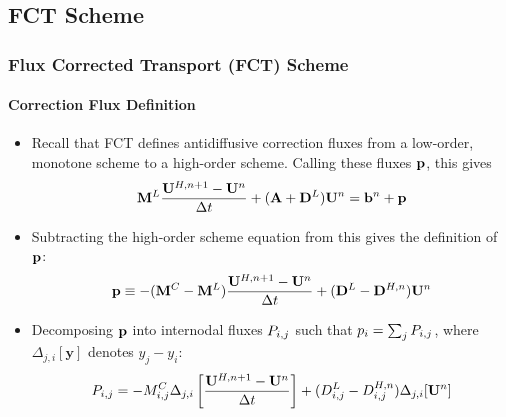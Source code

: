 \documentclass{beamer}
\begin{document}
\subsection{FCT Scheme}
\begin{frame}
\frametitle{Flux Corrected Transport (FCT) Scheme}
\framesubtitle{Correction Flux Definition}

\begin{itemize}
   \item Recall that FCT defines antidiffusive correction fluxes
      from a low-order, monotone scheme to a high-order scheme. Calling
      these fluxes $\mathbf{p}$, this gives
      \begin{equation}
        \lumpedmassmatrix\frac{\solutionvector^{H,n+1}-\solutionvector^n}{\dt}
          + (\ssmatrix+\diffusionmatrix^L)\solutionvector^n = \ssrhs^n
          + \correctionfluxvector
      \end{equation}
   \item Subtracting the high-order scheme equation from this gives the
      definition of $\mathbf{p}$:
      \begin{equation}
        \correctionfluxvector \equiv
          -(\consistentmassmatrix-\lumpedmassmatrix)
          \frac{\solutionvector^{H,n+1}-\solutionvector^n}{\dt}
          + (\diffusionmatrix^L-\diffusionmatrix^{H,n})\solutionvector^n
      \end{equation}
   \item Decomposing $\mathbf{p}$ into internodal fluxes
      $\correctionfluxij$ such that $\correctionfluxletter_i = \sum_j \correctionfluxij$, where $\Delta_{j,i}[\mathbf{y}]$
      denotes $y_j - y_i$:
   \begin{equation}
     \correctionfluxij = -M\ij^C\Delta_{j,i}\left[
       \frac{\solutionvector^{H,n+1}-\solutionvector^n}{\Delta t}\right]
       + (D\ij^L-D\ij^{H,n})\Delta_{j,i}[\solutionvector^n]
   \end{equation}
\end{itemize}

\end{frame}
\end{document}

